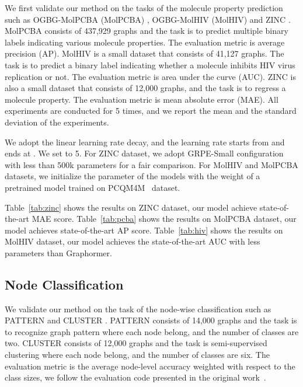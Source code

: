 \documentclass[letterpaper]{article} \usepackage{aaai23}  \usepackage{times}  \usepackage{helvet}  \usepackage{courier}  \usepackage[hyphens]{url}  \usepackage{graphicx} \urlstyle{rm} \def\UrlFont{\rm}  \usepackage{natbib}  \usepackage{caption} \frenchspacing  \setlength{\pdfpagewidth}{8.5in} \setlength{\pdfpageheight}{11in} \usepackage{algorithm}
\begin{document}
We first validate our method on the tasks of the molecule property prediction such as OGBG-MolPCBA (MolPCBA) \citep{hu2020open}, OGBG-MolHIV (MolHIV) \citep{hu2020open} and ZINC \citep{dwivedi2020benchmarking}.
MolPCBA consists of 437,929 graphs and the task is to predict multiple binary labels indicating various molecule properties. The evaluation metric is average precision (AP). 
MolHIV is a small dataset that consists of 41,127 graphs. 
The task is to predict a binary label indicating whether a molecule inhibits HIV virus replication or not. 
The evaluation metric is area under the curve (AUC).
ZINC is also a small dataset that consists of 12,000 graphs, and the task is to regress a molecule property. 
The evaluation metric is mean absolute error (MAE). 
All experiments are conducted for 5 times, and we report the mean and the standard deviation of the experiments.

We adopt the linear learning rate decay, and the learning rate starts from  and ends at .
We set  to 5. 
For ZINC dataset, we adopt GRPE-Small configuration with less than 500k parameters for a fair comparison.
For MolHIV and MolPCBA datasets, we initialize the parameter of the models with the weight of a pretrained model trained on PCQM4M~\citep{hu2020open} dataset.



Table~\ref{tab:zinc} shows the results on ZINC dataset, our model achieve state-of-the-art MAE score.
Table~\ref{tab:pcba} shows the results on MolPCBA dataset, our model achieves state-of-the-art AP score. 
Table~\ref{tab:hiv} shows the results on MolHIV dataset, our model achieves the state-of-the-art AUC with less parameters than Graphormer.



\subsection{Node Classification}
We validate our method on the task of the node-wise classification such as PATTERN and CLUSTER \cite{dwivedi2020benchmarking}. 
PATTERN consists of 14,000 graphs and the task is to recognize graph pattern where each node belong, and the number of classes are two.
CLUSTER consists of 12,000 graphs and the task is semi-supervised clustering where each node belong, and the number of classes are six.
The evaluation metric is the average node-level accuracy weighted with respect to the class sizes, we follow the evaluation code presented in the original work~\cite{dwivedi2020benchmarking}.
\end{document}
